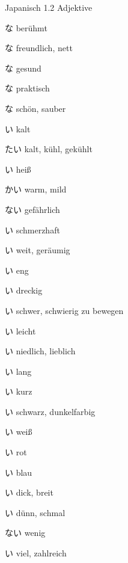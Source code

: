 \begin{multicols*}{2}
\begin{flushleft}
\begin{labeling}{Japanisch 1.2 Adjektive}
	\item [\ruby{有名}{ゆうめい}な] berühmt
	\item [\ruby{親切}{しんせつ}な] freundlich, nett
	\item [\ruby{元気}{げんき}な] gesund
	\item [\ruby{便利}{べんり}な] praktisch
	\item [\ruby{綺麗}{きれい}な] schön, sauber
	
	\item [\ruby{寒}{さむ}い] kalt
	\item [\ruby{冷}{つめ}たい] kalt, kühl, gekühlt
	\item [\ruby{暑}{あつ}い] heiß
	\item [\ruby{暖}{あたた}かい] warm, mild
	
	\item [\ruby{危}{あぶ}ない] gefährlich
	\item [\ruby{痛}{いた}い] schmerzhaft
	
	\item [\ruby{広}{ひろ}い] weit, geräumig
	\item [\ruby{狭}{せま}い] eng
	
	\item [\ruby{汚}{きたな}い] dreckig
	
	\item [\ruby{重}{おも}い] schwer, schwierig zu bewegen
	\item [\ruby{軽}{かる}い] leicht
	
	\item [\ruby{可愛}{かわい}い] niedlich, lieblich
	
	\item [\ruby{長}{なが}い] lang
	\item [\ruby{短}{みじか}い] kurz
	
	\item [\ruby{黒}{くろ}い] schwarz, dunkelfarbig
	\item [\ruby{白}{しろ}い] weiß
	
	\item [\ruby{赤}{あか}い] rot
	\item [\ruby{青}{あお}い] blau
	
	\item [\ruby{太}{ふと}い] dick, breit
	\item [\ruby{細}{ほそ}い] dünn, schmal
	
	\item [\ruby{少}{すく}ない] wenig
	\item [\ruby{多}{おお}い] viel, zahlreich
	

\end{labeling}
\end{flushleft}
\end{multicols*}

